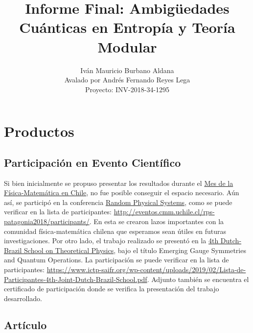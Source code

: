 \documentclass{article}
\title{Informe Final: Ambigüedades Cuánticas en Entropía y Teoría Modular}
\author{Iván Mauricio Burbano Aldana \\ Avalado por Andrés Fernando Reyes Lega \\ Proyecto: INV-2018-34-1295 }
\begin{document}
\maketitle

\section{Productos}

\subsection{Participación en Evento Científico}

Si bien inicialmente se propuso presentar los resultados durante el \href{https://2018fismatcl.wordpress.com/}{Mes de la Física-Matemática en Chile}, no fue posible conseguir el espacio necesario. Aún así, se participó en la conferencia \href{http://eventos.cmm.uchile.cl/rps-patagonia2018/}{Random Physical Systems}, como se puede verificar en la lista de participantes: \url{http://eventos.cmm.uchile.cl/rps-patagonia2018/participants/}. En esta se crearon lazos importantes con la comunidad física-matemática chilena que esperamos sean útiles en futuras investigaciones. Por otro lado, el trabajo realizado se presentó en la \href{https://www.ictp-saifr.org/4th-joint-dutch-brazil-school-on-theoretical-physics/}{4th Dutch-Brazil School on Theoretical Physics}, bajo el título Emerging Gauge Symmetries and Quantum Operations. La participación se puede verificar en la lista de participantes: \url{https://www.ictp-saifr.org/wp-content/uploads/2019/02/Lista-de-Participantes-4th-Joint-Dutch-Brazil-School.pdf}. Adjunto también se encuentra el certificado de participación donde se verifica la presentación del trabajo desarrollado.

\subsection{Artículo}
\end{document}
